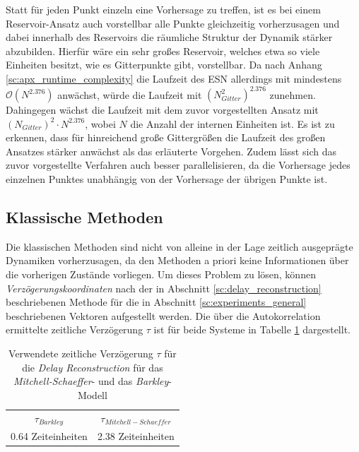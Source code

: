 Statt für jeden Punkt einzeln eine Vorhersage zu treffen, ist es bei einem Reservoir-Ansatz auch vorstellbar alle Punkte gleichzeitig vorherzusagen und dabei innerhalb des Reservoirs die räumliche Struktur der Dynamik stärker abzubilden. Hierfür wäre ein sehr großes Reservoir, welches etwa so viele Einheiten besitzt, wie es Gitterpunkte gibt, vorstellbar. Da nach Anhang \ref{sc:apx_runtime_complexity} die Laufzeit des \textsc{ESN} allerdings mit mindestens $\mathcal{O}(N^{2.376})$ anwächst, würde die Laufzeit mit $(N_{Gitter}^2)^{2.376}$ zunehmen. Dahingegen wächst die Laufzeit mit dem zuvor vorgestellten Ansatz mit $(N_{Gitter})^2 \cdot N^{2.376}$, wobei $N$ die Anzahl der internen Einheiten ist. Es ist zu erkennen, dass für hinreichend große Gittergrößen die Laufzeit des großen Ansatzes stärker anwächst als das erläuterte Vorgehen. Zudem lässt sich das zuvor vorgestellte Verfahren auch besser parallelisieren, da die Vorhersage jedes einzelnen Punktes unabhängig von der Vorhersage der übrigen Punkte ist.   

\FloatBarrier
\subsection{Klassische Methoden}
Die klassischen Methoden sind nicht von alleine in der Lage zeitlich ausgeprägte Dynamiken vorherzusagen, da den Methoden a priori keine Informationen über die vorherigen Zustände vorliegen. Um dieses Problem zu lösen, können \textit{Verzögerungskoordinaten} nach der in Abschnitt \ref{sc:delay_reconstruction} beschriebenen Methode für die in Abschnitt \ref{sc:experiments_general} beschriebenen Vektoren aufgestellt werden. Die über die Autokorrelation ermittelte zeitliche Verzögerung $\tau$ ist für beide Systeme in Tabelle \ref{tab:delay_reconstruction_tau} dargestellt.     

\begin{table}[h]
\centering
\begin{tabular}{cc}
\hline
$\tau_{Barkley}$ & $\tau_{Mitchell-Schaeffer}$ \\ 
0.64 Zeiteinheiten & 2.38 Zeiteinheiten\\ 
\hline 
\end{tabular} 
\caption{Verwendete zeitliche Verzögerung $\tau$ für die \textit{Delay Reconstruction} für das \textit{Mitchell-Schaeffer}- und das \textit{Barkley}-Modell}
\label{tab:delay_reconstruction_tau}
\end{table} 



